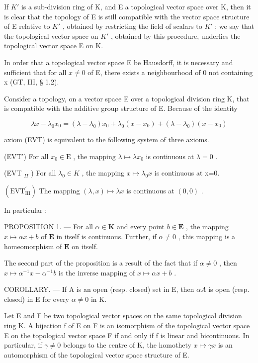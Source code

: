 If \(K'\) is a sub-division ring of K, and E a topological vector space over K, then it is clear that the topology of E is still compatible with the vector space structure of E relative to \(K'\) , obtained by restricting the field of scalars to \(K'\) ; we say that the topological vector space on \(K'\) , obtained by this procedure, underlies the topological vector space E on K.

In order that a topological vector space E be Hausdorff, it is necessary and sufficient that for all \(x \neq 0\) of E, there exists a neighbourhood of 0 not containing x (GT, III, § 1.2).

Consider a topology, on a vector space E over a topological division ring K, that is compatible with the additive group structure of E. Because of the identity

\[
\lambda x - \lambda_ {0} x _ {0} = (\lambda - \lambda_ {0}) x _ {0} + \lambda_ {0} (x - x _ {0}) + (\lambda - \lambda_ {0}) (x - x _ {0})
\]

axiom (EVT) is equivalent to the following system of three axioms.

(EVT') For all \(x_0 \in \mathrm{E}\) , the mapping \(\lambda \mapsto \lambda x_0\) is continuous at \(\lambda = 0\) .

(EVT \(_{II}\) ) For all \(\lambda_{0}\in K\) , the mapping \(x\mapsto\lambda_{0}x\) is continuous at x=0.

\((\mathrm{EVT}_{\mathrm{III}}^{\prime})\) The mapping \((\lambda, x) \mapsto \lambda x\) is continuous at \((0, 0)\) .

In particular :

PROPOSITION 1. --- For all \(\alpha \in \mathbf{K}\) and every point \(b \in \mathbf{E}\) , the mapping \(x \mapsto \alpha x + b\) of \(\mathbf{E}\) in itself is continuous. Further, if \(\alpha \neq 0\) , this mapping is a homeomorphism of \(\mathbf{E}\) on itself.

The second part of the proposition is a result of the fact that if \(\alpha \neq 0\) , then \(x \mapsto \alpha^{-1}x - \alpha^{-1}b\) is the inverse mapping of \(x \mapsto \alpha x + b\) .

COROLLARY. --- If A is an open (resp. closed) set in E, then \(\alpha A\) is open (resp. closed) in E for every \(\alpha \neq 0\) in K.

Let E and F be two topological vector spaces on the same topological division ring K. A bijection f of E on F is an isomorphism of the topological vector space E on the topological vector space F if and only if f is linear and bicontinuous. In particular, if \(\gamma \neq 0\) belongs to the centre of K, the homothety \(x \mapsto \gamma x\) is an automorphism of the topological vector space structure of E.

